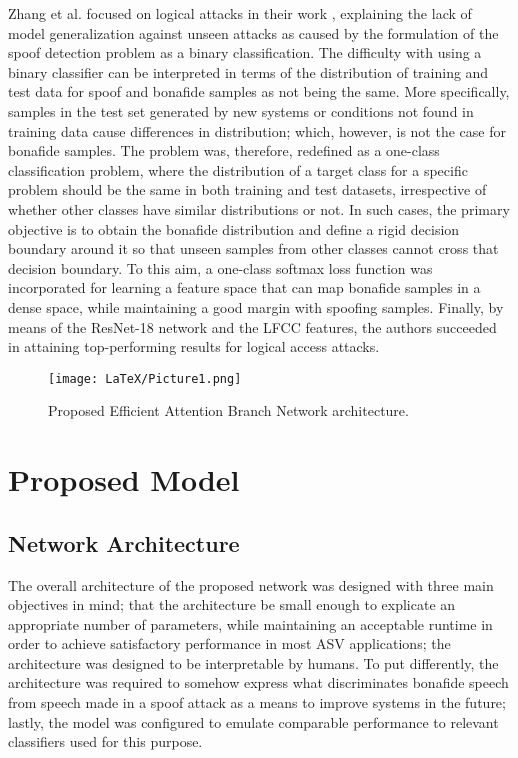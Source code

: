\documentclass[a4paper]{article}
\begin{document}
Zhang et al. focused on logical attacks in their work \cite{24zhang2021one}, explaining the lack of model generalization against unseen attacks as caused by the formulation of the spoof detection problem as a binary classification. The difficulty with using a binary classifier can be interpreted in terms of the distribution of training and test data for spoof and bonafide samples as not being the same. More specifically, samples in the test set generated by new systems or conditions not found in training data cause differences in distribution; which, however, is not the case for bonafide samples. The problem was, therefore, redefined as a one-class classification problem, where the distribution of a target class for a specific problem should be the same in both training and test datasets, irrespective of whether other classes have similar distributions or not. In such cases, the primary objective is to obtain the bonafide distribution and define a rigid decision boundary around it so that unseen samples from other classes cannot cross that decision boundary. To this aim, a one-class softmax loss function was incorporated for learning a feature space that can map bonafide samples in a dense space, while maintaining a good margin with spoofing samples. Finally, by means of the ResNet-18 network and the LFCC features, the authors succeeded in attaining top-performing results for logical access attacks.
\begin{figure}[H]
  \centering
  \texttt{[image: LaTeX/Picture1.png]}
  \caption{Proposed Efficient Attention Branch Network architecture.}
  \label{fig:AttentionBranchNetwork}
\end{figure}
\section{Proposed Model}
\subsection{Network Architecture}
The overall architecture of the proposed network was designed with three main objectives in mind; that the architecture be small enough to explicate an appropriate number of parameters, while maintaining an acceptable runtime in order to achieve satisfactory performance in most ASV applications; the architecture was designed to be interpretable by humans. To put differently, the architecture was required to somehow express what discriminates bonafide speech from speech made in a spoof attack as a means to improve systems in the future; lastly, the model was configured to emulate comparable performance to relevant classifiers used for this purpose.
\end{document}
